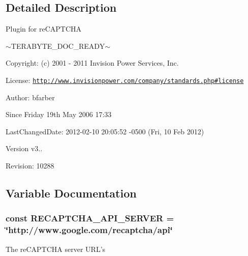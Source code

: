 \subsection{Detailed Description}
\begin{DoxyVerb}  Plugin for reCAPTCHA
\end{DoxyVerb}
 $\sim$\-T\-E\-R\-A\-B\-Y\-T\-E\-\_\-\-D\-O\-C\-\_\-\-R\-E\-A\-D\-Y$\sim$ \begin{DoxyParagraph}{Copyright\-:}
(c) 2001 -\/ 2011 Invision Power Services, Inc.
\end{DoxyParagraph}
\begin{DoxyParagraph}{License\-:}
\href{http://www.invisionpower.com/company/standards.php#license}{\tt http\-://www.\-invisionpower.\-com/company/standards.\-php\#license}
\end{DoxyParagraph}
\begin{DoxyParagraph}{Author\-:}
bfarber 
\end{DoxyParagraph}
\begin{DoxySince}{Since}
Friday 19th May 2006 17\-:33 
\end{DoxySince}
\begin{DoxyParagraph}{Last\-Changed\-Date\-:}
2012-\/02-\/10 20\-:05\-:52 -\/0500 (Fri, 10 Feb 2012) 
\end{DoxyParagraph}
\begin{DoxyVersion}{Version}
v3.. 
\end{DoxyVersion}
\begin{DoxyParagraph}{Revision\-:}
10288 
\end{DoxyParagraph}


\subsection{Variable Documentation}
\hypertarget{recaptcha_8php_a938a359c9dabc1c4764f1ae089767e68}{
\subsubsection[{R\-E\-C\-A\-P\-T\-C\-H\-A\-\_\-\-A\-P\-I\-\_\-\-S\-E\-R\-V\-E\-R}]{\setlength{\rightskip}{0pt plus 5cm}const R\-E\-C\-A\-P\-T\-C\-H\-A\-\_\-\-A\-P\-I\-\_\-\-S\-E\-R\-V\-E\-R = \char`\"{}http\-://www.\-google.\-com/recaptcha/api\char`\"{}}}\label{recaptcha_8php_a938a359c9dabc1c4764f1ae089767e68}
The re\-C\-A\-P\-T\-C\-H\-A server U\-R\-L's 